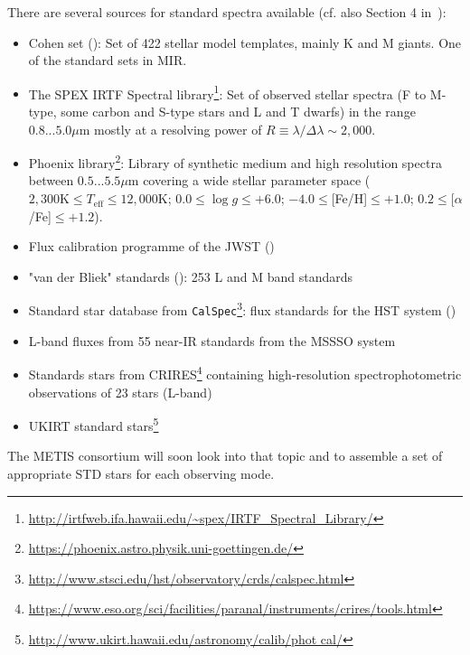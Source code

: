 There are several sources for standard spectra available (cf. also Section 4 in~\cite{METIS-calibration_plan}):
\begin{itemize}
    \item Cohen set (\cite{coh99}): Set of 422 stellar model templates, mainly K and M giants. One of the standard sets in \ac{MIR}.
    \item The SPEX \ac{IRTF} Spectral library\footnote{\url{http://irtfweb.ifa.hawaii.edu/~spex/IRTF_Spectral_Library/}}: Set of observed stellar spectra (F to M-type, some carbon and S-type stars and L and T dwarfs) in the range $0.8...5.0\mu$m mostly at a resolving power of $R\equiv\lambda/\Delta\lambda\sim2,000$.
    \item Phoenix library\footnote{\url{https://phoenix.astro.physik.uni-goettingen.de/}}\cite{phoenix}: Library of synthetic medium and high resolution spectra between $0.5...5.5\mu$m covering a wide stellar parameter space ($2,300\textrm{K}\leq T_\textrm{eff}\leq12,000\textrm{K}$; $0.0\leq\log g\leq+6.0$; $-4.0\leq$[Fe/H]$\leq+1.0$; $0.2\leq$[$\alpha$/Fe]$\leq+1.2$).
    \item Flux calibration programme of the \ac{JWST} (\cite{gor22})
    \item "van der Bliek" standards (\cite{vdb96}): 253 L and M band standards
    \item Standard star database from \texttt{CalSpec}\footnote{\url{http://www.stsci.edu/hst/observatory/crds/calspec.html}}: flux standards for the \ac{HST} system (\cite{boh14})
    \item L-band fluxes from 55 near-IR standards from the MSSSO system~\cite{mcg94}
    \item Standards stars from CRIRES\footnote{\url{https://www.eso.org/sci/facilities/paranal/instruments/crires/tools.html}} containing high-resolution spectrophotometric observations of 23 stars (L-band)
    \item  UKIRT standard stars\footnote{\url{http://www.ukirt.hawaii.edu/astronomy/calib/phot cal/}}
\end{itemize}
The \ac{METIS} consortium will soon look into that topic and to assemble a set of appropriate \ac{STD} stars for each observing mode.

